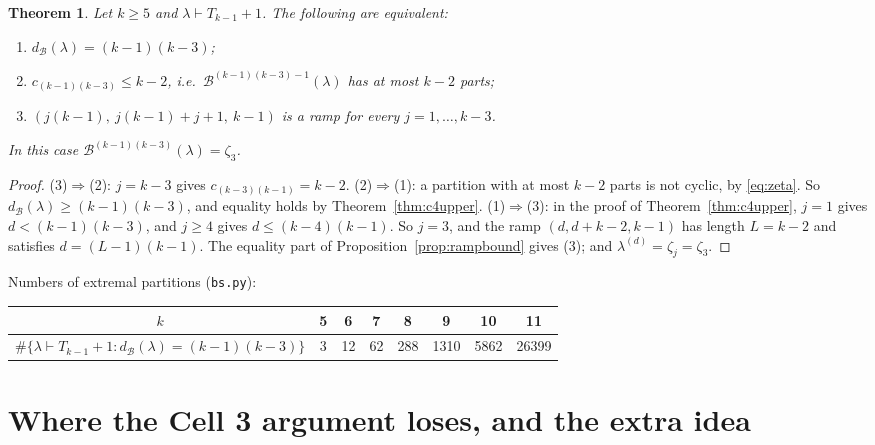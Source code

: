 \documentclass[11pt]{article}
\newtheorem{theorem}{Theorem}[section]
\theoremstyle{definition}
\newcommand{\B}{\mathcal{B}}
\newcommand{\dB}{d_{\mathcal{B}}}
\renewcommand{\le}{\leqslant}
\renewcommand{\ge}{\geqslant}
\begin{document}
\begin{theorem}\label{thm:c4ext}
Let $k\ge5$ and $\lambda\vdash T_{k-1}+1$.  The following are equivalent:
\begin{enumerate}
\item[(1)] $\dB(\lambda)=(k-1)(k-3)$;
\item[(2)] $c_{(k-1)(k-3)}\le k-2$, i.e.\ $\B^{(k-1)(k-3)-1}(\lambda)$ has at most $k-2$ parts;
\item[(3)] $(j(k-1),\ j(k-1)+j+1,\ k-1)$ is a ramp for every $j=1,\dots,k-3$.
\end{enumerate}
In this case $\B^{(k-1)(k-3)}(\lambda)=\zeta_3$.
\end{theorem}
\begin{proof}
(3)$\Rightarrow$(2): $j=k-3$ gives $c_{(k-3)(k-1)}=k-2$.
(2)$\Rightarrow$(1): a partition with at most $k-2$ parts is not cyclic, by \eqref{eq:zeta}.  So
$\dB(\lambda)\ge(k-1)(k-3)$, and equality holds by Theorem~\ref{thm:c4upper}.
(1)$\Rightarrow$(3): in the proof of Theorem~\ref{thm:c4upper}, $j=1$ gives $d<(k-1)(k-3)$, and $j\ge4$ gives
$d\le(k-4)(k-1)$.  So $j=3$, and the ramp $(d,d+k-2,k-1)$ has length $L=k-2$ and satisfies $d=(L-1)(k-1)$.
The equality part of Proposition~\ref{prop:rampbound} gives (3); and $\lambda^{(d)}=\zeta_j=\zeta_3$.
\end{proof}

Numbers of extremal partitions (\texttt{bs.py}):
\begin{center}
\begin{tabular}{c|ccccccc}
$k$ & 5 & 6 & 7 & 8 & 9 & 10 & 11\\\hline
$\#\{\lambda\vdash T_{k-1}+1:\dB(\lambda)=(k-1)(k-3)\}$ & 3 & 12 & 62 & 288 & 1310 & 5862 & 26399
\end{tabular}
\end{center}

\section{Where the Cell 3 argument loses, and the extra idea}\label{sec:loss}
\end{document}
